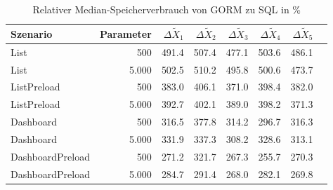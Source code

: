 
\begin{table}[ht]
\setlength{\extrarowheight}{-1pt}
\centering
\caption{Relativer Median-Speicherverbrauch von GORM zu SQL in \%}
\begin{tabular}{lrrrrrrr}
\toprule
Szenario & Parameter & ${\Delta \tilde{X}_1}$ & ${\Delta \tilde{X}_2}$ & ${\Delta \tilde{X}_3}$ & ${\Delta \tilde{X}_4}$ & ${\Delta \tilde{X}_5}$ \\
\midrule
	List & 500 & \cellcolor{red!50}  491.4 & \cellcolor{red!50}  507.4 & \cellcolor{red!50}  477.1 & \cellcolor{red!50}  503.6 & \cellcolor{red!50}  486.1 \\
	List & 5.000 & \cellcolor{red!50}  502.5 & \cellcolor{red!50}  510.2 & \cellcolor{red!50}  495.8 & \cellcolor{red!50}  500.6 & \cellcolor{red!50}  473.7 \\
	ListPreload & 500 & \cellcolor{red!50}  383.0 & \cellcolor{red!50}  406.1 & \cellcolor{red!50}  371.0 & \cellcolor{red!50}  398.4 & \cellcolor{red!50}  382.0 \\
	ListPreload & 5.000 & \cellcolor{red!50}  392.7 & \cellcolor{red!50}  402.1 & \cellcolor{red!50}  389.0 & \cellcolor{red!50}  398.2 & \cellcolor{red!50}  371.3 \\
	Dashboard & 500 & \cellcolor{red!50}  316.5 & \cellcolor{red!50}  377.8 & \cellcolor{red!50}  314.2 & \cellcolor{red!50}  296.7 & \cellcolor{red!50}  316.3 \\
	Dashboard & 5.000 & \cellcolor{red!50}  331.9 & \cellcolor{red!50}  337.3 & \cellcolor{red!50}  308.2 & \cellcolor{red!50}  328.6 & \cellcolor{red!50}  313.1 \\
	DashboardPreload & 500 & \cellcolor{red!50}  271.2 & \cellcolor{red!50}  321.7 & \cellcolor{red!50}  267.3 & \cellcolor{red!50}  255.7 & \cellcolor{red!50}  270.3 \\
	DashboardPreload & 5.000 & \cellcolor{red!50}  284.7 & \cellcolor{red!50}  291.4 & \cellcolor{red!50}  268.0 & \cellcolor{red!50}  282.1 & \cellcolor{red!50}  269.8 \\
\bottomrule
\end{tabular}
\label{tab:relativer_speicherverbrauch_gorm}
\end{table}
	